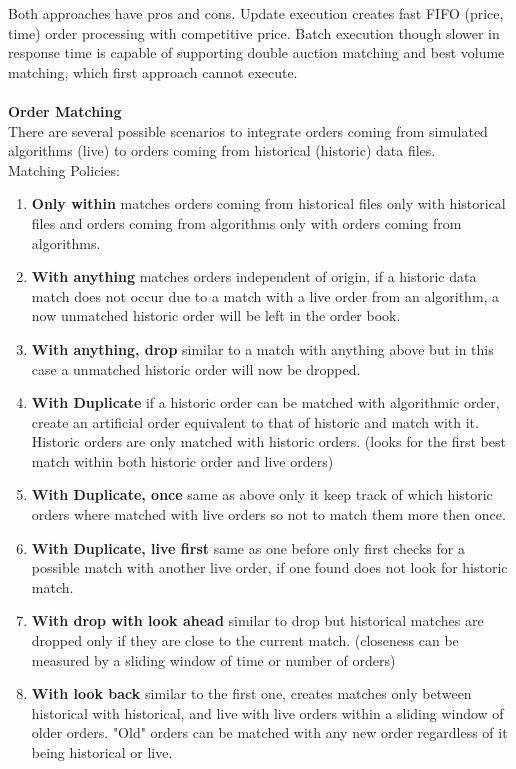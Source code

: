 \documentclass[11pt]{article}
\begin{document}
Both approaches have pros and cons. Update execution creates fast FIFO (price, time) order processing with competitive price. Batch execution though slower in response time is capable of supporting double auction matching and best volume matching, which first approach cannot execute. 
\\
\\
{\bf Order Matching} 
\\
There are several possible scenarios to integrate orders coming from simulated algorithms (live) to orders coming from historical (historic) data files.
\\
\noindent Matching Policies:
\begin{enumerate}
    \item {\bf Only within} matches orders coming from historical files only with historical files and orders coming from algorithms only with orders coming from algorithms.
    \item{\bf With anything} matches orders independent of origin, if a historic data match does not occur due to a match with a live order from an algorithm, a now unmatched historic order will be left in the order book. 
    \item{\bf With anything, drop} similar to a match with anything above but in this case a unmatched historic order will now be dropped. 
    \item{\bf With Duplicate} if a historic order can be matched with algorithmic order, create an artificial order equivalent to that of historic and match with it. Historic orders are only matched with historic orders. (looks for the first best match within both historic order and live orders)
    \item{\bf With Duplicate, once} same as above only it keep track of which historic orders where matched with live orders so not to match them more then once. 
    \item{\bf With Duplicate, live first} same as one before only first checks for a possible match with another live order, if one found does not look for historic match. 
    \item{\bf With drop with look ahead} similar to drop but historical matches are dropped only if they are close to the current match. (closeness can be measured by a sliding window of time or number of orders)
    \item{\bf With look back} similar to the first one, creates matches only between historical with historical, and live with live orders within a sliding window of older orders. "Old" orders can be matched with any new order regardless of it being historical or live.
\end{enumerate}
\end{document}

